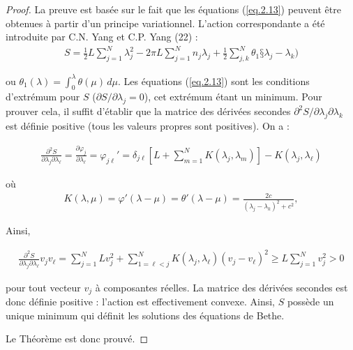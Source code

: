\begin{proof}
	 La preuve est basée sur le fait que les équations (\ref{eq.2.13}) peuvent être obtenues à partir d'un principe variationnel. L'action correspondante a été introduite par C.N. Yang et C.P. Yang (22) :	
	 \begin{eqnarray}
	 	S = \frac{1}{2} L \sum_{j=1}^N  \lambda_j^2 - 2 \pi L \sum_{j=1}^N  n_j  \lambda_j + \frac{1}2 \sum_{ j , k } ^N \theta_1 § \lambda_j - \lambda_k ) 		
	 \end{eqnarray}
	 
	 ou $ \theta_1 ( \lambda )  = \int_0^\lambda \theta ( \mu ) \, d \mu $.
	 Les équations (\ref{eq.2.13}) sont les conditions d'extrémum pour \( S \) (\( \partial S / \partial \lambda_j = 0 \)), cet extrémum étant un minimum. Pour prouver cela, il suffit d'établir que la matrice des dérivées secondes \( \partial^2 S / \partial \lambda_j \partial \lambda_k \) est définie positive (tous les valeurs propres sont positives). On a :
	 
	 \begin{eqnarray}
	 	\frac{\partial^2 S}{\partial \lambda_j \partial \lambda_\ell} = \frac{ \partial \varphi_j }{\partial \lambda_ \ell } = \varphi_{j\ell}' = \delta_{j\ell} 	\left [  L + \sum_{m = 1 }^N K ( \lambda_j , \lambda_m ) \right ]  - K ( \lambda_j , \lambda_\ell )
	 \end{eqnarray}
	 
	 où
	 \begin{eqnarray}
	 	K(\lambda, \mu) = \varphi' ( \lambda - \mu ) = \theta' ( \lambda - \mu ) = \frac{2c}{(\lambda_j - \lambda_k)^2 + c^2},	
	 \end{eqnarray}
	 
	 Ainsi,
	 
	 \begin{eqnarray}
	 	\frac{\partial^2 S}{\partial \lambda_j \partial \lambda_\ell} v_j v_\ell = \sum_{ j = 1 } ^N L v_j^2 + \sum_{1 = \ell < j }^N K ( \lambda_j , \lambda_\ell ) ( v_j - v_\ell ) ^2 \geq L \sum_{ j = 1 }^N v_j^2 >0 	 
	 \end{eqnarray}
	 
	 pour tout vecteur \( v_j \) à composantes réelles. La matrice des dérivées secondes est donc définie positive : l'action est effectivement convexe. Ainsi, \( S \) possède un unique minimum qui définit les solutions des équations de Bethe.

	Le Théorème est donc prouvé.


\end{proof}



